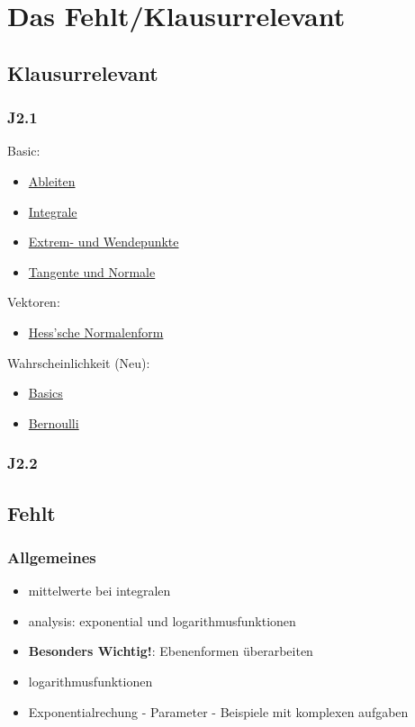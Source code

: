 \chapter{Das Fehlt/Klausurrelevant}

\section{Klausurrelevant}
\subsection{J2.1}
Basic:
\begin{multicols}{2}
    \begin{itemize}
        \item \hyperref[sec:ableiten]{Ableiten}
        \item \hyperref[sec:integrale]{Integrale} 
        \item \hyperref[sec:extremundwendepunkte]{Extrem- und Wendepunkte}
        \item \hyperref[sec:tangenteundnormale]{Tangente und Normale}
    \end{itemize}
\end{multicols}

Vektoren:
\begin{itemize}
    \item \hyperref[sec:hessscheform]{Hess'sche Normalenform}
\end{itemize}

Wahrscheinlichkeit (Neu):
\begin{itemize}
    \item \hyperref[sec:elemkombinatorik]{Basics}
    \item \hyperref[sec:bernoulli]{Bernoulli}
\end{itemize}

\subsection{J2.2}

\secspacehuge

\section{Fehlt}
\subsection{Allgemeines}
\begin{itemize}
    \item mittelwerte bei integralen
    \item analysis: exponential und logarithmusfunktionen
    \item \textbf{Besonders Wichtig!}: Ebenenformen überarbeiten 
    \item logarithmusfunktionen
    \item Exponentialrechung - Parameter - Beispiele mit komplexen aufgaben
\end{itemize}

